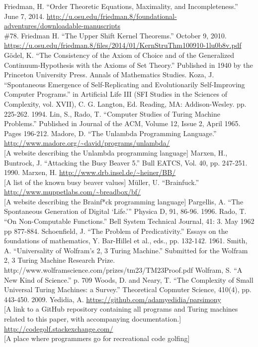 \documentclass[11pt]{article}
\begin{document}
\begin{thebibliography}{100}
 Friedman, H. ``Order Theoretic Equations, Maximality, and Incompleteness.'' June 7, 2014. \url{http://u.osu.edu/friedman.8/foundational-adventures/downloadable-manuscripts} \\
\#78.
 Friedman H. ``The Upper Shift Kernel Theorems.'' October 9, 2010. \url{https://u.osu.edu/friedman.8/files/2014/01/KernStruThm100910-1lu0b8v.pdf}
 G\"odel, K. ``The Consistency of the Axiom of Choice and of the Generalized Continuum-Hypothesis with the Axioms of Set Theory.'' Published in 1940 by the Princeton University Press. Annals of Mathematics Studies.
 Koza, J. ``Spontaneous Emergence of Self-Replicating and Evolutionarily Self-Improving Computer Programs.'' in Artificial Life III (SFI Studies in the Sciences of Complexity, vol. XVII), C. G. Langton, Ed. Reading, MA: Addison-Wesley. pp. 225-262. 1994.
 Lin, S., Rado, T. ``Computer Studies of Turing Machine Problems.'' Published in Journal of the ACM, Volume 12, Issue 2, April 1965. Pages 196-212.
 Madore, D. ``The Unlambda Programming Language.'' \url{http://www.madore.org/~david/programs/unlambda/} \\
{[A website describing the Unlambda programming language]}
 Marxen, H., Buntrock, J. ``Attacking the Busy Beaver 5.'' Bull EATCS, Vol. 40, pp. 247-251. 1990.
 Marxen, H.
\url{http://www.drb.insel.de/~heiner/BB/} \\
{[A list of the known busy beaver values]}
 M\"uller, U. ``Brainfuck.'' \url{http://www.muppetlabs.com/~breadbox/bf/} \\
{[A website describing the Brainf*ck programming language]}
 Pargellis, A. ``The Spontaneous Generation of Digital {`Life.'}'' Physica D, 91, 86-96. 1996.
 Rado, T. ``On Non-Computable Functions.'' Bell System Technical Journal, 41: 3. May 1962 pp 877-884.
 Schoenfield, J. ``The Problem of Predicativity.'' Essays on the foundations of mathematics, Y. Bar-Hillel et al., eds., pp. 132-142. 1961.
 Smith, A. ``Universality of Wolfram's 2, 3 Turing Machine.'' Submitted for the Wolfram 2, 3 Turing Machine Research Prize. http://www.wolframscience.com/prizes/tm23/TM23Proof.pdf
 Wolfram, S. ``A New Kind of Science.'' p. 709
 Woods, D. and Neary, T. ``The Complexity of Small Universal Turing Machines: a Survey.'' Theoretical Copmuter Science, 410(4), pp. 443-450. 2009.
 Yedidia, A. \url{https://github.com/adamyedidia/parsimony} \\
{[A link to a GitHub repository containing all programs and Turing machines related to this paper, with accompanying documentation.]}
 \url{http://codegolf.stackexchange.com/} \\
{[A place where programmers go for recreational code golfing]}
\end{thebibliography}
\end{document}
